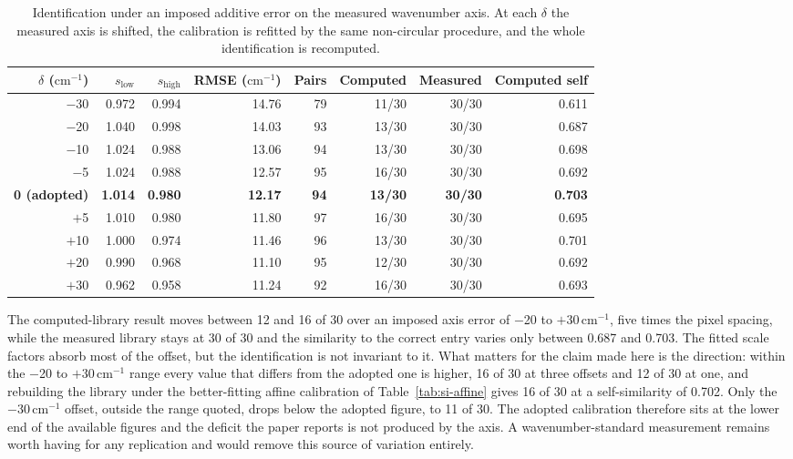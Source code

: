\documentclass[11pt]{article}
\newcommand*\wn{\ensuremath{\text{cm}^{-1}}}
\begin{document}
\begin{table}[htbp]
\centering
\caption{Identification under an imposed additive error on the measured wavenumber axis.
At each $\delta$ the measured axis is shifted, the calibration is refitted by the same
non-circular procedure, and the whole identification is recomputed.}
\label{tab:si-offsetscan}
\small
\begin{tabular}{rrrrrrrr}
\toprule
$\delta$ (\wn) & $s_\mathrm{low}$ & $s_\mathrm{high}$ & RMSE (\wn) & Pairs & Computed & Measured & Computed self \\
\midrule
$-$30 & 0.972 & 0.994 & 14.76 & 79 & 11/30 & 30/30 & 0.611 \\
$-$20 & 1.040 & 0.998 & 14.03 & 93 & 13/30 & 30/30 & 0.687 \\
$-$10 & 1.024 & 0.988 & 13.06 & 94 & 13/30 & 30/30 & 0.698 \\
$-$5 & 1.024 & 0.988 & 12.57 & 95 & 16/30 & 30/30 & 0.692 \\
\textbf{0 (adopted)} & \textbf{1.014} & \textbf{0.980} & \textbf{12.17} & \textbf{94} & \textbf{13/30} & \textbf{30/30} & \textbf{0.703} \\
$+$5 & 1.010 & 0.980 & 11.80 & 97 & 16/30 & 30/30 & 0.695 \\
$+$10 & 1.000 & 0.974 & 11.46 & 96 & 13/30 & 30/30 & 0.701 \\
$+$20 & 0.990 & 0.968 & 11.10 & 95 & 12/30 & 30/30 & 0.692 \\
$+$30 & 0.962 & 0.958 & 11.24 & 92 & 16/30 & 30/30 & 0.693 \\
\bottomrule
\end{tabular}

\begin{flushleft}\footnotesize The computed-library result moves between 12 and 16 of 30
over an imposed axis error of $-$20 to $+$30\,\wn{}, five times the pixel spacing, while
the measured library stays at 30 of 30 and the similarity to the correct entry varies only
between 0.687 and 0.703. The fitted scale factors absorb most of the offset, but the
identification is not invariant to it. What matters for the claim made here is the
direction: within the $-$20 to $+$30\,\wn{} range every value that differs from the adopted one is
higher, 16 of 30 at three offsets and 12 of 30 at one, and rebuilding the library under
the better-fitting affine calibration of Table~\ref{tab:si-affine} gives 16 of 30 at a
self-similarity of 0.702. Only the $-$30\,\wn{} offset, outside the range quoted, drops
below the adopted figure, to 11 of 30. The adopted calibration therefore sits at the lower
end of the available figures and the deficit the paper reports is not produced by the
axis. A wavenumber-standard measurement remains worth
having for any replication and would remove this source of variation
entirely.\end{flushleft}
\end{table}
\end{document}
